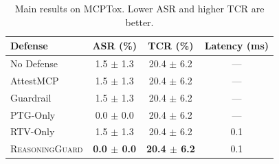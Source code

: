 \begin{table}[t]
\centering
\small
\begin{tabular}{lccc}
\toprule
Defense & ASR (\%) & TCR (\%) & Latency (ms) \\
\midrule
No Defense & 1.5 $\pm$ 1.3 & 20.4 $\pm$ 6.2 & --- \\
AttestMCP & 1.5 $\pm$ 1.3 & 20.4 $\pm$ 6.2 & --- \\
Guardrail & 1.5 $\pm$ 1.3 & 20.4 $\pm$ 6.2 & --- \\
PTG-Only & 0.0 $\pm$ 0.0 & 20.4 $\pm$ 6.2 & --- \\
RTV-Only & 1.5 $\pm$ 1.3 & 20.4 $\pm$ 6.2 & 0.1 \\
\textsc{ReasoningGuard} & \textbf{0.0 $\pm$ 0.0} & \textbf{20.4 $\pm$ 6.2} & 0.1 \\
\bottomrule
\end{tabular}
\caption{Main results on MCPTox. Lower ASR and higher TCR are better.}
\label{tab:main}
\end{table}
